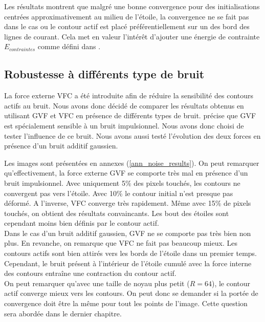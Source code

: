 Les résultats montrent que malgré une bonne convergence pour des initialisations centrées approximativement au milieu de l'étoile, la convergence ne se fait pas dans le cas ou le contour actif est placé préférentiellement sur un des bord des lignes de courant. Cela met en valeur l'intérêt d'ajouter une énergie de contrainte $E_{contraintes}$ comme défini dans \cite{kaas}. 


\subsection{Robustesse à différents type de bruit}
La force externe VFC a été introduite afin de réduire la sensibilité des contours actifs au bruit. Nous avons donc décidé de comparer les résultats obtenus en utilisant GVF et VFC en présence de différents types de bruit. \cite{vfc} précise que GVF est spécialement sensible à un bruit impulsionnel. Nous avons donc choisi de tester l'influence de ce bruit. Nous avons aussi testé l'évolution des deux forces en présence d'un bruit additif gaussien. 

Les images sont présentées en annexes (\ref{ann_noise_results}). On peut remarquer qu'effectivement, la force externe GVF se comporte très mal en présence d'un bruit impulsionnel. Avec uniquement 5\% des pixels touchés, les contours ne convergent pas vers l'étoile. Avec 10\% le contour initial n'est presque pas déformé. A l'inverse, VFC converge très rapidement. Même avec 15\% de pixels touchés, on obtient des résultats convaincants. Les bout des étoiles sont cependant moins bien définis par le contour actif.\\

Dans le cas d'un bruit additif gaussien, GVF ne se comporte pas très bien non plus. En revanche, on remarque que VFC ne fait pas beaucoup mieux. Les contours actifs sont bien attirés vers les bords de l'étoile dans un premier temps. Cependant, le bruit présent à l'intérieur de l'étoile cumulé avec la force interne des contours entraîne une contraction du contour actif.\\

On peut remarquer qu'avec une taille de noyau plus petit ($R = 64$), le contour actif converge mieux vers les contours. On peut donc se demander si la portée de convergence doit être la même pour tout les points de l'image. Cette question sera abordée dans le dernier chapitre.
